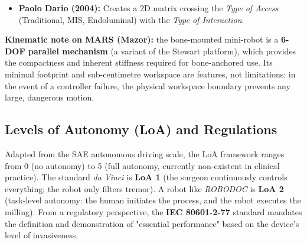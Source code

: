 \documentclass[11pt,a4paper,twoside]{report}
\begin{document}
\begin{itemize}
\begin{enumerate}
        \item \textit{Intraoperative imaging and navigation}: optical tracking requires an unobstructed line of sight; the Viewing Wand passive arm avoids this limitation.
        \item \textit{Robotics}: floor-/bed-mounted (e.g., ROBODOC, MAKO) or \textbf{patient-mounted} (e.g., Mazor/MARS). Relevant context: pedicle screw insertion targets a vertebral corridor of only \textbf{5--7\,mm} (lumbar; less in the thoracic spine), and historically \textbf{10--40\%} of screws were malpositioned. Patient-mounted robots (bone-anchored) automatically compensate for global patient movements such as breathing, because the robot's reference frame moves rigidly with the bone.
    \end{enumerate}
    \item \textbf{Paolo Dario (2004):} Creates a 2D matrix crossing the \textit{Type of Access} (Traditional, MIS, Endoluminal) with the \textit{Type of Interaction}.
\end{itemize}

\textbf{Kinematic note on MARS (Mazor):} the bone-mounted mini-robot is a \textbf{6-DOF parallel mechanism} (a variant of the Stewart platform), which provides the compactness and inherent stiffness required for bone-anchored use. Its minimal footprint and sub-centimetre workspace are features, not limitations: in the event of a controller failure, the physical workspace boundary prevents any large, dangerous motion.

\subsection{Levels of Autonomy (LoA) and Regulations}
Adapted from the SAE autonomous driving scale, the LoA framework ranges from 0 (no autonomy) to 5 (full autonomy, currently non-existent in clinical practice). The standard \textit{da Vinci} is \textbf{LoA 1} (the surgeon continuously controls everything; the robot only filters tremor). A robot like \textit{ROBODOC} is \textbf{LoA 2} (task-level autonomy: the human initiates the process, and the robot executes the milling).
From a regulatory perspective, the \textbf{IEC 80601-2-77} standard mandates the definition and demonstration of "essential performance" based on the device's level of invasiveness.

\end{document}
